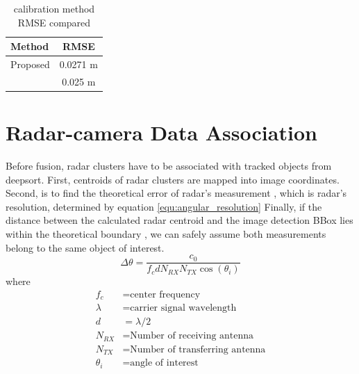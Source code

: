 \begin{table}[h!]
    \begin{center}
      \label{tab:table4}
      \begin{tabular}{l|c} %
        \textbf{Method} & \textbf{RMSE} \\%
        \hline
        Proposed                            & 0.0271 m \\%
        \citeauthor{8794186}\cite{8794186}  & 0.025 m \\%
        
      \end{tabular}
    \end{center}
    \caption{calibration method RMSE compared}
    \label{tab:callib_rmse}
  \end{table}


\newpage
\section{Radar-camera Data Association}\label{sec:2-association}
Before fusion, radar clusters have to be associated with tracked objects from deepsort.
First, centroids of radar clusters are mapped into image coordinates.
Second, is to find the theoretical error of radar's measurement \cite{8844649}, which is radar's resolution, determined by equation \ref*{equ:angular_resolution}
Finally, if the distance between the calculated radar centroid and the image detection BBox lies within the theoretical boundary
, we can safely assume both measurements belong to the same object of interest.
\begin{equation}\label{equ:angular_resolution}
    \Delta \theta= \frac{c_0}{f_c d N_{RX} N_{TX} \cos(\theta _i)}
\end{equation}
where
\begin{align*}
    f_c & = \text{center frequency} \\
    \lambda & = \text{carrier signal wavelength} \\
    d & =  \lambda/2 \\
    N_{RX} & = \text{Number of receiving antenna}\\
    N_{TX}& = \text{Number of transferring antenna}\\
    \theta _i &= \text{angle of interest}
\end{align*}

